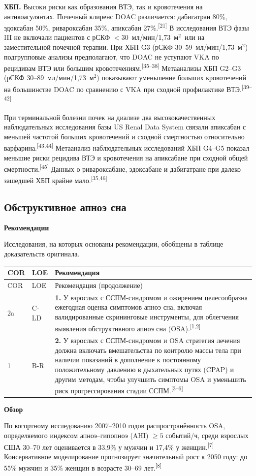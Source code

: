 \documentclass[11pt,a4paper]{article}
\newcommand{\src}[1]{\textsuperscript{[#1]}}
\newcommand{\heading}[1]{\par\medskip\textbf{#1}\par}
\newcommand{\unitgfr}{мл/мин/1,73~м$^2$}
\begin{document}
\textbf{ХБП.} Высоки риски как образования ВТЭ, так и кровотечения на антикоагулянтах. Почечный клиренс DOAC различается: дабигатран 80\%, эдоксабан 50\%, ривароксабан 35\%, апиксабан 27\%.\src{21} В исследования ВТЭ фазы III не включали пациентов с рСКФ $<30$~\unitgfr\ или на заместительной почечной терапии. При ХБП G3 (рСКФ 30--59~\unitgfr) подгрупповые анализы предполагают, что DOAC не уступают VKA по рецидивам ВТЭ или большим кровотечениям.\src{35--38} Метаанализы ХБП G2--G3 (рСКФ 30--89~\unitgfr) показывают уменьшение больших кровотечений на большинстве DOAC по сравнению с VKA при сходной профилактике ВТЭ.\src{39--42}

При терминальной болезни почек на диализе два высококачественных наблюдательных исследования базы US Renal Data System связали апиксабан с меньшей частотой больших кровотечений и сходной смертностью относительно варфарина.\src{43,44} Метаанализ наблюдательных исследований ХБП G4--G5 показал меньшие риски рецидива ВТЭ и кровотечения на апиксабане при сходной общей смертности.\src{45} Данных о ривароксабане, эдоксабане и дабигатране при далеко зашедшей ХБП крайне мало.\src{35,46}

\subsection{Обструктивное апноэ сна}
\heading{Рекомендации}
Исследования, на которых основаны рекомендации, обобщены в таблице доказательств оригинала.
{\small
\begin{longtable}{P{0.07\textwidth}P{0.11\textwidth}P{0.75\textwidth}}
\toprule COR & LOE & Рекомендация\\\midrule
\endfirsthead
\toprule COR & LOE & Рекомендация (продолжение)\\\midrule
\endhead
2a & C-LD & \textbf{1.} У взрослых с ССПМ-синдромом и ожирением целесообразна ежегодная оценка симптомов апноэ сна, включая валидированные скрининговые инструменты, для облегчения выявления обструктивного апноэ сна (OSA).\src{1,2}\\[5pt]
1 & B-R & \textbf{2.} У взрослых с ССПМ-синдромом и OSA стратегия лечения должна включать вмешательства по контролю массы тела при наличии показаний в дополнение к постоянному положительному давлению в дыхательных путях (CPAP) и другим методам, чтобы улучшить симптомы OSA и уменьшить риск прогрессирования стадии ССПМ.\src{3--6}\\
\bottomrule
\end{longtable}
}

\heading{Обзор}
По когортному исследованию 2007--2010 годов распространённость OSA, определяемого индексом апноэ--гипопноэ (AHI) $\geq5$ событий/ч, среди взрослых США 30--70 лет оценивается в 33,9\% у мужчин и 17,4\% у женщин.\src{7} Консервативное моделирование прогнозирует значительный рост к 2050 году: до 55\% мужчин и 35\% женщин в возрасте 30--69 лет.\src{8}
\end{document}
